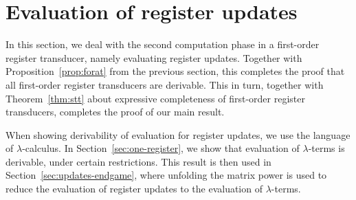 
\section{Evaluation of register updates}
\label{sec:stt-derivable}
In this section, we deal with the second computation phase in a first-order register transducer, namely evaluating register updates. Together with Proposition~\ref{prop:forat} from the previous section, this completes the proof that all first-order register transducers are derivable. This in turn, together with Theorem~\ref{thm:stt} about expressive completeness of first-order register transducers, completes the proof of our main result. 


When showing derivability of  evaluation for register updates, we  use the language of $\lambda$-calculus.  In Section~\ref{sec:one-register},  we show that evaluation of $\lambda$-terms is derivable, under certain restrictions. This result is then used in Section~\ref{sec:updates-endgame}, where unfolding the matrix power is used to reduce the evaluation of register updates to the evaluation of $\lambda$-terms.  


%



